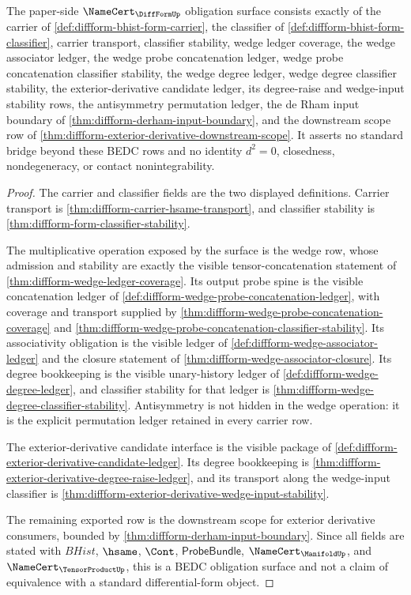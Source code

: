 \begin{theorem}
\label{thm:diffform-namecert-obligation-surface}
The paper-side $\NameCert_{\DiffFormUp}$ obligation surface consists exactly
of the carrier of \autoref{def:diffform-bhist-form-carrier}, the classifier
of \autoref{def:diffform-bhist-form-classifier}, carrier transport,
classifier stability, wedge ledger coverage, the wedge associator ledger, the
wedge probe concatenation ledger, wedge probe concatenation classifier
stability, the wedge degree ledger, wedge degree classifier stability, the
exterior-derivative candidate ledger, its degree-raise and wedge-input
stability rows, the antisymmetry permutation ledger, the de Rham input boundary of
\autoref{thm:diffform-derham-input-boundary}, and the downstream scope row of
\autoref{thm:diffform-exterior-derivative-downstream-scope}. It asserts no
standard bridge beyond these BEDC rows and no identity $d^2=0$, closedness,
nondegeneracy, or contact nonintegrability.
\end{theorem}
\begin{proof}
The carrier and classifier fields are the two displayed definitions. Carrier
transport is \autoref{thm:diffform-carrier-hsame-transport}, and classifier
stability is \autoref{thm:diffform-form-classifier-stability}.

The multiplicative operation exposed by the surface is the wedge row, whose
admission and stability are exactly the visible tensor-concatenation statement
of \autoref{thm:diffform-wedge-ledger-coverage}. Its output probe spine is the
visible concatenation ledger of
\autoref{def:diffform-wedge-probe-concatenation-ledger}, with coverage and
transport supplied by
\autoref{thm:diffform-wedge-probe-concatenation-coverage} and
\autoref{thm:diffform-wedge-probe-concatenation-classifier-stability}. Its
associativity obligation is the visible ledger of
\autoref{def:diffform-wedge-associator-ledger} and the closure statement of
\autoref{thm:diffform-wedge-associator-closure}. Its degree bookkeeping is the
visible unary-history ledger of \autoref{def:diffform-wedge-degree-ledger},
and classifier stability for that ledger is
\autoref{thm:diffform-wedge-degree-classifier-stability}.
Antisymmetry is not hidden in the wedge operation: it is the explicit
permutation ledger retained in every carrier row.

The exterior-derivative candidate interface is the visible package of
\autoref{def:diffform-exterior-derivative-candidate-ledger}. Its degree
bookkeeping is
\autoref{thm:diffform-exterior-derivative-degree-raise-ledger}, and its
transport along the wedge-input classifier is
\autoref{thm:diffform-exterior-derivative-wedge-input-stability}.

The remaining exported row is the downstream scope for exterior derivative
consumers, bounded by \autoref{thm:diffform-derham-input-boundary}. Since all
fields are stated with $BHist$, $\hsame$, $\Cont$, $\mathsf{ProbeBundle}$,
$\NameCert_{\ManifoldUp}$, and $\NameCert_{\TensorProductUp}$, this is a BEDC
obligation surface and not a claim of equivalence with a standard
differential-form object.
\end{proof}
